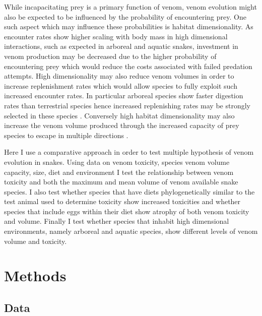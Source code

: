 While incapacitating prey is a primary function of venom, venom evolution might also be expected to be influenced by the probability of encountering prey. One such aspect which may influence these probabilities is habitat dimensionality. As encounter rates show higher scaling with body mass in high dimensional interactions, such as expected in arboreal and aquatic snakes, investment in venom production may be decreased due to the higher probability of encountering prey which would reduce the costs associated with failed predation attempts. High dimensionality may also reduce venom volumes in order to increase replenishment rates which would allow species to fully exploit such increased encounter rates. In particular arboreal species show faster digestion rates than terrestrial species hence increased replenishing rates may be strongly selected in these species \citep{lillywhite2002patterns}. Conversely high habitat dimensionality may also increase the venom volume produced through the increased capacity of prey species to escape in multiple directions \citep{healy2014ecology,moller2010up}.

Here I use a comparative approach in order to test multiple hypothesis of venom evolution in snakes. Using data on venom toxicity, species venom volume capacity, size, diet and environment I test the relationship between venom toxicity and both the maximum and mean volume of venom available snake species. I also test whether species that have diets phylogenetically similar to the test animal used to determine toxicity show increased toxicities and whether species that include eggs within their diet show atrophy of both venom toxicity and volume. Finally I test whether species that inhabit high dimensional environments, namely arboreal and aquatic species, show different levels of venom volume and toxicity.

\section{Methods}
\subsection{Data}

